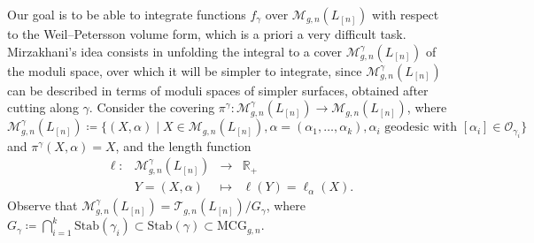 \documentclass[12pt]{amsart}
\theoremstyle{plain}
\theoremstyle{definition}
\theoremstyle{remark}
\numberwithin{equation}{section}
\begin{document}
Our goal is to be able to integrate functions $f_{\gamma}$ over $\mathcal{M}_{g,n}(L_{[n]})$ with respect to the Weil--Petersson volume form, which is a priori a very difficult task. Mirzakhani's idea consists in unfolding the integral to a cover  $\mathcal{M}_{g,n}^{\gamma}(L_{[n]})$ of the moduli space, over which it will be simpler to integrate, since  $\mathcal{M}_{g,n}^{\gamma}(L_{[n]})$ can be described in terms of moduli spaces of simpler surfaces, obtained after cutting along $\gamma$. Consider the covering $\pi^{\gamma}\colon \mathcal{M}_{g,n}^{\gamma}(L_{[n]})\rightarrow \mathcal{M}_{g,n}(L_{[n]})$, where
$$
\mathcal{M}_{g,n}^{\gamma}(L_{[n]})\coloneqq \{(X,\alpha)\mid X\in \mathcal{M}_{g,n}(L_{[n]}), \alpha=(\alpha_1,\ldots,\alpha_k), \alpha_i \text{ geodesic with } [\alpha_i]\in \mathcal{O}_{\gamma_i}\}
$$
and $\pi^{\gamma}(X,\alpha)=X$, and the length function 
$$
\begin{array}{lrcl}
\ell \colon & \mathcal{M}_{g,n}^{\gamma}(L_{[n]})&\longrightarrow  & \mathbb{R}_+\\
& Y=(X,\alpha) & \mapsto & \ell(Y)=\ell_{\alpha}(X).
\end{array}
$$
Observe that $\mathcal{M}_{g,n}^{\gamma}(L_{[n]})=\mathcal{T}_{g,n}(L_{[n]})/G_{\gamma}$, where $G_{\gamma}\coloneqq\bigcap_{i=1}^k\mathrm{Stab}(\gamma_i)\subset \mathrm{Stab}(\gamma)\subset\mathrm{MCG}_{g,n}$.
\end{document}
